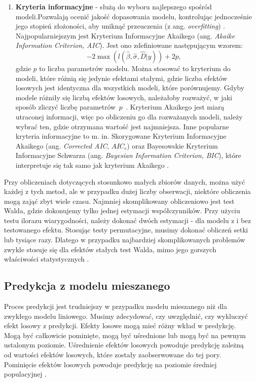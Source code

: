 \documentclass[12pt]{mwbk}
\theoremstyle{plain}
\theoremstyle{definition}
\theoremstyle{definition}
\begin{document}
\begin{enumerate}
	\item \textbf{Kryteria informacyjne} - służą do wyboru najlepszego spośród modeli.Pozwalają ocenić jakość dopasowania modelu, kontrolując jednocześnie jego stopień złożoności, aby uniknąć przeuczenia (z ang. \textit{overfitting}) \cite{szeregi}.
	 Najpopularniejszym jest Kryterium Informacyjne Akaikego (ang. \textit{Akaike Information Criterion, AIC}). Jest ono zdefiniowane następującym wzorem:
	$$-2\operatorname{max}(l(\hat{\beta}, \hat{\sigma}, \hat{D}|y))+ 2p,$$
	gdzie $p$ to liczba parametrów modelu. Można stosować to kryterium do modeli, które różnią się jedynie efektami stałymi, gdzie liczba efektów losowych jest identyczna dla wszystkich modeli, które porównujemy. Gdyby modele różniły się liczbą efektów losowych, należałoby rozważyć, w jaki sposób zliczyć liczbę parametrów~$p$~\cite{faraway}. Kryterium Akaikego jest miarą utraconej informacji, więc po obliczeniu go dla rozważanych modeli, należy wybrać ten, gdzie otrzymana wartość jest najmniejsza. Inne popularne kryteria informacyjne to m. in. Skorygowane Kryterium Informacyjne Akaikego (ang. \textit{Corrected AIC}, $AIC_c$) oraz Bayesowskie Kryterium Informacyjne Schwarza (ang. \textit{Bayesian Information Criterion, BIC}), które interpretuje się tak samo jak kryterium Akaikego \cite{szeregi}.

\end{enumerate}

Przy obliczeniach dotyczących stosunkowo małych zbiorów danych, można użyć każdej z tych metod, ale w przypadku dużej liczby obserwacji, niektóre obliczenia mogą zająć zbyt wiele czasu. Najmniej skomplikowany obliczeniowo jest test Walda, gdzie dokonujemy tylko jednej estymacji współczynników. Przy użyciu testu ilorazu wiarygodności, należy dokonać dwóch estymacji - dla modelu z i bez testowanego efektu. Stosując testy permutacyjne, musimy dokonać obliczeń setki lub tysiące razy. Dlatego w przypadku najbardziej skomplikowanych problemów zwykle stosuje się dla efektów stałych test Walda, mimo jego gorszych właściwości statystycznych \cite{biecek}.





\subsection{Predykcja z modelu mieszanego}
Proces predykcji jest trudniejszy w przypadku modelu mieszanego niż dla zwykłego modelu liniowego. Musimy zdecydować, czy uwzględnić, czy wykluczyć efekt losowy z predykcji. Efekty losowe mogą mieć różny wkład w predykcję. Mogą być całkowicie pominięte, mogą być uśrednione lub mogą być na pewnym ustalonym poziomie. Uśrednienie efektów losowych powoduje predykcję zależną od wartości efektów losowych, które zostały zaobserwowane do tej pory. Pominięcie efektów losowych powoduje predykcję na poziomie średniej populacyjnej
 \cite{prediction}.
 
\end{document}

